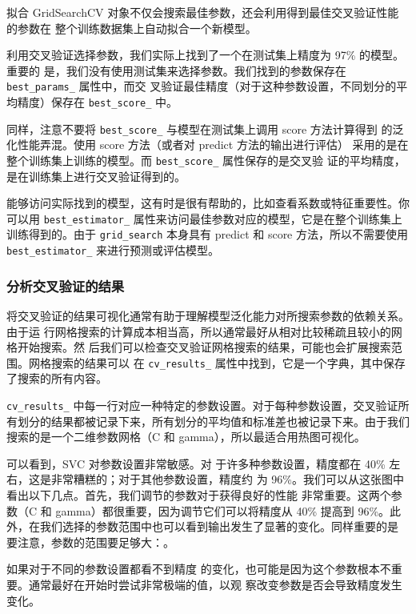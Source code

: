 拟合 GridSearchCV 对象不仅会搜索最佳参数，还会利用得到最佳交叉验证性能的参数在
整个训练数据集上自动拟合一个新模型。

利用交叉验证选择参数，我们实际上找到了一个在测试集上精度为 97\% 的模型。重要的
是，我们没有使用测试集来选择参数。我们找到的参数保存在 \verb|best_params_| 属性中，而交
叉验证最佳精度（对于这种参数设置，不同划分的平均精度）保存在 \verb|best_score_| 中。

\begin{tcolorbox}
    同样，注意不要将 \verb|best_score_| 与模型在测试集上调用 score 方法计算得到
    的泛化性能弄混。使用 score 方法（或者对 predict 方法的输出进行评估）
    采用的是在整个训练集上训练的模型。而 \verb|best_score_| 属性保存的是交叉验
    证的平均精度，是在训练集上进行交叉验证得到的。
\end{tcolorbox}

能够访问实际找到的模型，这有时是很有帮助的，比如查看系数或特征重要性。你可以用
\verb|best_estimator_| 属性来访问最佳参数对应的模型，它是在整个训练集上训练得到的。由于 \verb|grid_search| 本身具有 predict 和 score 方法，所以不需要使用 \verb|best_estimator_| 来进行预测或评估模型。
\subsubsection{分析交叉验证的结果}
将交叉验证的结果可视化通常有助于理解模型泛化能力对所搜索参数的依赖关系。由于运
行网格搜索的计算成本相当高，所以通常最好从相对比较稀疏且较小的网格开始搜索。然
后我们可以检查交叉验证网格搜索的结果，可能也会扩展搜索范围。网格搜索的结果可以
在 \verb|cv_results_| 属性中找到，它是一个字典，其中保存了搜索的所有内容。

\verb|cv_results_| 中每一行对应一种特定的参数设置。对于每种参数设置，交叉验证所有划分的结果都被记录下来，所有划分的平均值和标准差也被记录下来。由于我们搜索的是一个二维参数网格（C 和 gamma），所以最适合用热图可视化。

可以看到，SVC 对参数设置非常敏感。对
于许多种参数设置，精度都在 40\% 左右，这是非常糟糕的；对于其他参数设置，精度约
为 96\%。我们可以从这张图中看出以下几点。首先，我们调节的参数对于获得良好的性能
非常重要。这两个参数（C 和 gamma）都很重要，因为调节它们可以将精度从 40\% 提高到
96\%。此外，在我们选择的参数范围中也可以看到输出发生了显著的变化。同样重要的是
要注意，参数的范围要足够大：。


如果对于不同的参数设置都看不到精度
的变化，也可能是因为这个参数根本不重要。通常最好在开始时尝试非常极端的值，以观
察改变参数是否会导致精度发生变化。

